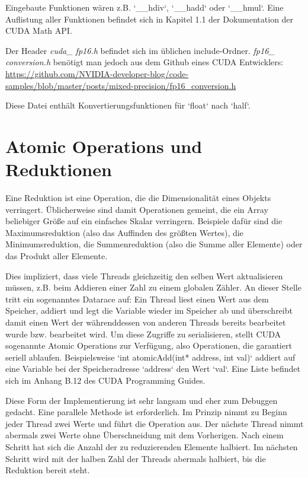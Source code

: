 		Eingebaute Funktionen wären z.B. \li`__hdiv`, \li`__hadd` oder \li`__hmul`. Eine Auflistung aller Funktionen befindet sich in Kapitel 1.1 der Dokumentation der CUDA Math \Gls{API}. \autocite{cudaMath}
		
		Der Header \textit{cuda\_ fp16.h} befindet sich im üblichen include-Ordner. \textit{fp16\_ conversion.h} benötigt man jedoch aus dem Github eines CUDA Entwicklers: \url{https://github.com/NVIDIA-developer-blog/code-samples/blob/master/posts/mixed-precision/fp16_conversion.h}
		
		Diese Datei enthält Konvertierungsfunktionen für \li`float` nach \li`half`.
	
		
		\section{Atomic Operations und Reduktionen}\label{red}
		Eine Reduktion ist eine Operation, die die Dimensionalität eines Objekts verringert. Üblicherweise sind damit Operationen gemeint, die ein Array beliebiger Größe auf ein einfaches Skalar verringern. Beispiele dafür sind die Maximumsreduktion (also das Auffinden des größten Wertes), die Minimumsreduktion, die Summenreduktion (also die Summe aller Elemente) oder das Produkt aller Elemente. 
		
		Dies impliziert, dass viele \Glspl{Thread} gleichzeitig den selben Wert aktualisieren müssen, z.B. beim Addieren einer Zahl zu einem globalen Zähler. An dieser Stelle tritt ein sogenanntes Datarace auf: Ein \Gls{Thread} liest einen Wert aus dem Speicher, addiert und legt die Variable wieder im Speicher ab und überschreibt damit einen Wert der währenddessen von anderen \Glspl{Thread} bereits bearbeitet wurde bzw. bearbeitet wird. Um diese Zugriffe zu serialisieren, stellt CUDA sogenannte Atomic Operations zur Verfügung, also Operationen, die garantiert seriell ablaufen. Beispielsweise \li`int atomicAdd(int* address, int val)` addiert auf eine Variable bei der Speicheradresse \li`address` den Wert \li`val`. Eine Liste befindet sich im Anhang B.12 des CUDA Programming Guides. \autocite{cudaPG}
		
		Diese Form der Implementierung ist sehr langsam und eher zum Debuggen gedacht. Eine parallele Methode ist erforderlich. Im Prinzip nimmt zu Beginn jeder \Gls{Thread} zwei Werte und führt die Operation aus. Der nächste \Gls{Thread} nimmt abermals zwei Werte ohne Überschneidung mit dem Vorherigen. Nach einem Schritt hat sich die Anzahl der zu reduzierenden Elemente halbiert. Im nächsten Schritt wird mit der halben Zahl der \Glspl{Thread} abermals halbiert, bis die Reduktion bereit steht.
		
